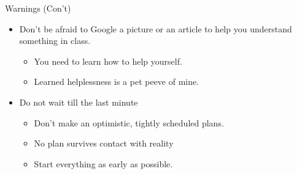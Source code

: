 \documentclass[
  ignorenonframetext,
]{beamer}
\providecommand{\tightlist}{%
  \setlength{\itemsep}{0pt}\setlength{\parskip}{0pt}}
\begin{document}
\begin{frame}{Warnings (Con't)}
\protect\hypertarget{warnings-cont}{}

\begin{itemize}
\tightlist
\item
  Don't be afraid to Google a picture or an article to help you
  understand something in class.

  \begin{itemize}
  \tightlist
  \item
    You need to learn how to help yourself.
  \item
    Learned helplessness is a pet peeve of mine.
  \end{itemize}
\item
  Do not wait till the last minute

  \begin{itemize}
  \tightlist
  \item
    Don't make an optimistic, tightly scheduled plans.
  \item
    No plan survives contact with reality
  \item
    Start everything as early as possible.
  \end{itemize}
\end{itemize}

\end{frame}
\end{document}
